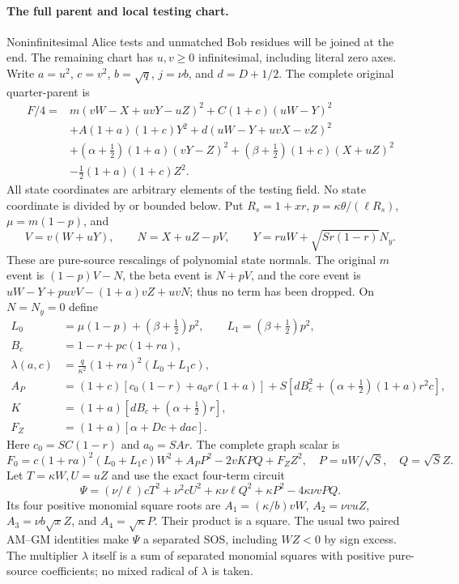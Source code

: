 \paragraph{The full parent and local testing chart.}
Noninfinitesimal Alice tests and unmatched Bob residues will be joined
at the end.  The remaining chart has $u,v\ge0$ infinitesimal,
including literal zero axes.  Write $a=u^2$, $c=v^2$,
$b=\sqrt q$, $j=\nu b$, and $d=D+1/2$.
The complete original quarter-parent is
\[
\begin{aligned}
 F/4={}&m(vW-X+uvY-uZ)^2+C(1+c)(uW-Y)^2\\
 &+A(1+a)(1+c)Y^2+d(uW-Y+uvX-vZ)^2\\
 &+(\alpha+\tfrac12)(1+a)(vY-Z)^2
 +(\beta+\tfrac12)(1+c)(X+uZ)^2\\
 &-\tfrac12(1+a)(1+c)Z^2.
\end{aligned}                                                     \tag{EL0b}
\]
All state coordinates are arbitrary elements of the testing field.
No state coordinate is divided by or bounded below.
Put $R_s=1+xr$, $p=\kappa\theta/(\ell R_s)$, $\mu=m(1-p)$, and
\[
 V=v(W+uY),\qquad N=X+uZ-pV,\qquad
 Y=ruW+\sqrt{Sr(1-r)}N_y.                         \tag{EL1}
\]
These are pure-source rescalings of polynomial state normals.
The original $m$ event is $(1-p)V-N$, the beta event is $N+pV$,
and the core event is
$uW-Y+puvV-(1+a)vZ+uvN$; thus no term has been dropped.
On $N=N_y=0$ define
\[
\begin{aligned}
 L_0&=\mu(1-p)+(\beta+\tfrac12)p^2,
 \qquad L_1=(\beta+\tfrac12)p^2,\\
 B_c&=1-r+pc(1+ra),\\
 \lambda(a,c)&=\frac q{\kappa^2}(1+ra)^2(L_0+L_1c),\\
 A_P&=(1+c)[c_0(1-r)+a_0r(1+a)]
       +S[dB_c^2+(\alpha+\tfrac12)(1+a)r^2c],\\
 K&=(1+a)[dB_c+(\alpha+\tfrac12)r],\\
 F_Z&=(1+a)[\alpha+Dc+dac].
\end{aligned}                                                    \tag{EL2}
\]
Here $c_0=SC(1-r)$ and $a_0=SAr$.  The complete graph scalar is
\[
 F_0=c(1+ra)^2(L_0+L_1c)W^2+A_PP^2-2vKPQ+F_ZZ^2,
 \quad P=uW/\sqrt S,\quad Q=\sqrt S Z.             \tag{EL3}
\]
Let $T=\kappa W,U=uZ$ and use the exact four-term circuit
\[
 \Psi=(\nu/\ell)cT^2+\nu^2cU^2+\kappa\nu\ell Q^2
       +\kappa P^2-4\kappa\nu vPQ.                \tag{EL4}
\]
Its four positive monomial square roots are
$A_1=(\kappa/b)vW$, $A_2=\nu vuZ$,
$A_3=\nu b\sqrt xZ$, and $A_4=\sqrt\kappa P$.
Their product is a square.  The usual two paired AM--GM identities
make $\Psi$ a separated SOS, including $WZ<0$ by sign excess.
The multiplier $\lambda$ itself is a sum of separated monomial
squares with positive pure-source coefficients; no mixed radical
of $\lambda$ is taken.

